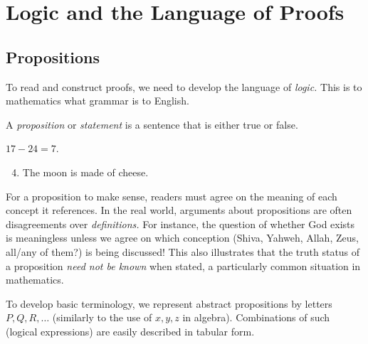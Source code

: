 \section{Logic and the Language of Proofs}\label{chap:logic}

\subsection{Propositions}\label{sec:prop}

To read and construct proofs, we need to develop the language of \emph{logic.} This is to mathematics what grammar is to English.


\begin{defn}{}{}
	A \emph{proposition} or \emph{statement} is a sentence that is either true or false.
\end{defn}

\begin{examples}{}{}
	\exstart $17-24=7$. \hfill {}
	\begin{enumerate}\setcounter{enumi}{3}\itemsep0pt
		\item The moon is made of cheese. \hfill {}
	\end{enumerate}
\end{examples}

For a proposition to make sense, readers must agree on the meaning of each concept it references. In the real world, arguments about propositions are often disagreements over \emph{definitions.} For instance, the question of whether God exists is meaningless unless we agree on which conception (Shiva, Yahweh, Allah, Zeus, all/any of them?) is being discussed! This also illustrates that the truth status of a proposition \emph{need not be known} when stated, a particularly common situation in mathematics.




To develop basic terminology, we represent abstract propositions by letters $P,Q,R,\ldots$ (similarly to the use of  $x,y,z$ in algebra). Combinations of such (logical expressions) are easily described in tabular form.

